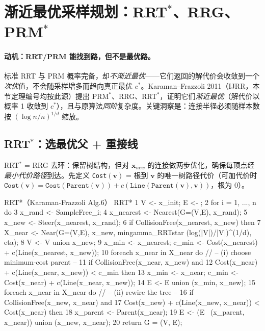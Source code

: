 \section{渐近最优采样规划：RRT$^*$、RRG、PRM$^*$}
\label{sec:plan-optimal}

\paragraph{动机：RRT/PRM 能找到路，但不是最优路。}
标准 RRT 与 PRM 概率完备，却\emph{不渐近最优}——它们返回的解代价会收敛到一个\emph{次优}值，不会随采样增多而趋向真正最优 $c^*$。Karaman--Frazzoli 2011\cite{karaman2011sampling}（IJRR，本节定理编号均按此源）提出 PRM$^*$、RRG、RRT$^*$，证明它们\emph{渐近最优}（解代价以概率 1 收敛到 $c^*$），且与原算法\emph{同阶}复杂度。关键洞察是：连接半径必须随样本数按 $(\log n/n)^{1/d}$ 缩放。

\subsection{RRT$^*$：选最优父 + 重接线}
\label{sec:plan-rrtstar}

RRT$^*$ = RRG 去环：保留树结构，但对 $\mathbf{x}_{new}$ 的连接做两步优化，确保每顶点经\emph{最小代价路径}到达。先定义 \texttt{Cost}$(\mathbf{v})$ = 根到 $\mathbf{v}$ 的唯一树路径代价（可加代价时 $\texttt{Cost}(\mathbf{v})=\texttt{Cost}(\texttt{Parent}(\mathbf{v}))+c(\texttt{Line}(\texttt{Parent}(\mathbf{v}),\mathbf{v}))$，根为 0）。

\begin{algo}[RRT$^*$]\label{alg:plan-rrtstar}
\end{algo}
\begin{codebox}[text]{RRT*（Karaman-Frazzoli Alg.6）}
RRT*
 1  V <- {x_init};  E <- {};
 2  for i = 1, ..., n do
 3      x_rand    <- SampleFree_i;
 4      x_nearest <- Nearest(G=(V,E), x_rand);
 5      x_new     <- Steer(x_nearest, x_rand);
 6      if CollisionFree(x_nearest, x_new) then
 7          X_near <- Near(G=(V,E), x_new, min{gamma_RRTstar (log(|V|)/|V|)^(1/d), eta});
 8          V <- V union {x_new};
 9          x_min <- x_nearest;  c_min <- Cost(x_nearest) + c(Line(x_nearest, x_new));
10          foreach x_near in X_near do                 // -- (i) choose minimum-cost parent --
11              if CollisionFree(x_near, x_new) and
12                 Cost(x_near) + c(Line(x_near, x_new)) < c_min then
13                  x_min <- x_near;  c_min <- Cost(x_near) + c(Line(x_near, x_new));
14          E <- E union {(x_min, x_new)};
15          foreach x_near in X_near do                 // -- (ii) rewire the tree --
16              if CollisionFree(x_new, x_near) and
17                 Cost(x_new) + c(Line(x_new, x_near)) < Cost(x_near) then
18                  x_parent <- Parent(x_near);
19                  E <- (E \ {(x_parent, x_near)}) union {(x_new, x_near)};
20  return G = (V, E);
\end{codebox}

